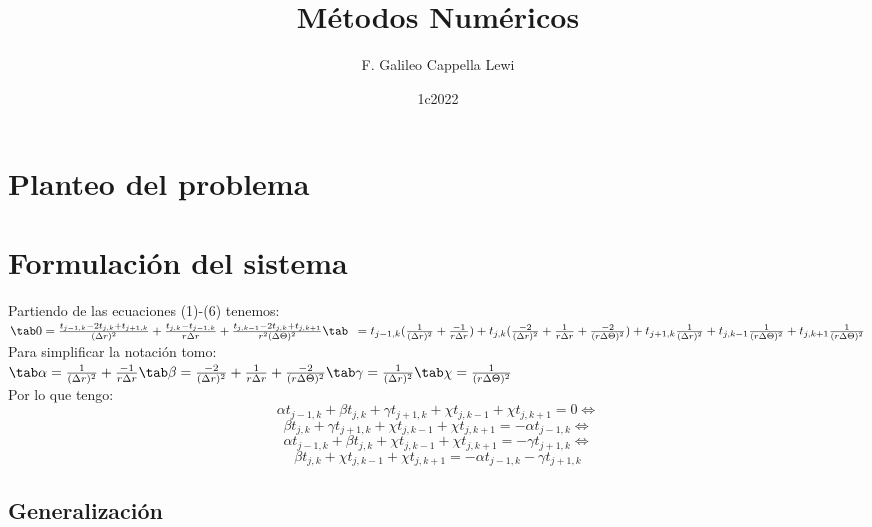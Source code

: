 \documentclass[12pt]{article}
\title{Métodos Numéricos}
\author{F. Galileo Cappella Lewi}
\date{1c2022}
\newcommand{\sub}[3]{\ensuremath{#1_{#2,#3}}}
\begin{document}
\maketitle

\section{Planteo del problema}

\section{Formulación del sistema}

\noindent Partiendo de las ecuaciones (1)-(6) tenemos: \\ \(
\tab 0 = \frac{\sub{t}{j-1}{k} - 2\sub{t}{j}{k} + \sub{t}{j+1}{k}}{(\Delta r)^2} + \frac{\sub{t}{j}{k} - \sub{t}{j-1}{k}}{r \Delta r} + \frac{\sub{t}{j}{k-1} - 2\sub{t}{j}{k} + \sub{t}{j}{k+1}}{r^2 (\Delta \Theta)^2} \\
\tab \phantom{0} = \sub{t}{j-1}{k} (\frac{1}{(\Delta r)^{2}} + \frac{-1}{r \Delta r}) + \sub{t}{j}{k} (\frac{-2}{(\Delta r)^2} + \frac{1}{r \Delta r} + \frac{-2}{(r \Delta \Theta)^{2}}) + \sub{t}{j+1}{k} \frac{1}{(\Delta r)^{2}} + \sub{t}{j}{k-1} \frac{1}{(r \Delta \Theta)^{2}} + \sub{t}{j}{k+1} \frac{1}{(r\Delta \Theta)^{2}} \) \\
Para simplificar la notación tomo: \\ \(
\tab \alpha = \frac{1}{(\Delta r)^{2}} + \frac{-1}{r \Delta r} \\
\tab \beta = \frac{-2}{(\Delta r)^2} + \frac{1}{r \Delta r} + \frac{-2}{(r \Delta \Theta)^{2}} \\
\tab \gamma = \frac{1}{(\Delta r)^{2}} \\ 
\tab \chi = \frac{1}{(r \Delta \Theta)^{2}}
\) \\
Por lo que tengo: \\
\[\alpha \sub{t}{j-1}{k} + \beta \sub{t}{j}{k} + \gamma \sub{t}{j+1}{k} + \chi \sub{t}{j}{k-1} + \chi \sub{t}{j}{k+1} = 0 \iff\]
\[\beta \sub{t}{j}{k} + \gamma \sub{t}{j+1}{k} + \chi \sub{t}{j}{k-1} + \chi \sub{t}{j}{k+1} = -\alpha \sub{t}{j-1}{k} \iff\]
\[\alpha \sub{t}{j-1}{k} + \beta \sub{t}{j}{k} + \chi \sub{t}{j}{k-1} + \chi \sub{t}{j}{k+1} = -\gamma \sub{t}{j+1}{k} \iff\]
\[\beta \sub{t}{j}{k} + \chi \sub{t}{j}{k-1} + \chi \sub{t}{j}{k+1} = -\alpha \sub{t}{j-1}{k} - \gamma \sub{t}{j+1}{k}\]

\subsection{Generalización}
\end{document}
